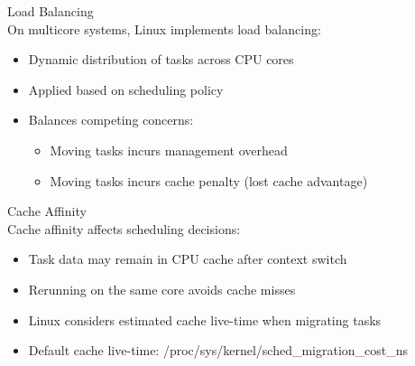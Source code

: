\begin{definition}{Load Balancing}\\
    On multicore systems, Linux implements load balancing:
    \begin{itemize}
        \item Dynamic distribution of tasks across CPU cores
        \item Applied based on scheduling policy
        \item Balances competing concerns:
            \begin{itemize}
                \item Moving tasks incurs management overhead
                \item Moving tasks incurs cache penalty (lost cache advantage)
            \end{itemize}
    \end{itemize}
\end{definition}

\begin{definition}{Cache Affinity}\\
    Cache affinity affects scheduling decisions:
    \begin{itemize}
        \item Task data may remain in CPU cache after context switch
        \item Rerunning on the same core avoids cache misses
        \item Linux considers estimated cache live-time when migrating tasks
        \item Default cache live-time: /proc/sys/kernel/sched\_migration\_cost\_ns
    \end{itemize}
\end{definition}

